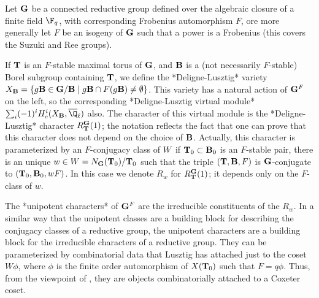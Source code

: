 \def\bB{{\bf B}}
\def\bG{{\bf G}}
\def\bL{{\bf L}}
\def\bP{{\bf P}}
\def\bT{{\bf T}}
\def\bU{{\bf U}}
\def\Sym{{\mathfrak S}}

Let $\bG$ be a connected reductive group defined over the algebraic closure
of  a finite field  $\F_q$, with corresponding  Frobenius automorphism $F$,
ore  more generally let $F$ be  an isogeny of $\bG$ such  that a power is a
Frobenius (this covers the Suzuki and Ree groups).

If  $\bT$ is  an $F$-stable  maximal torus  of $\bG$,  and $\bB$  is a (not
necessarily  $F$-stable)  Borel  subgroup  containing  $\bT$, we define the
*Deligne-Lusztig*    variety   $X_\bB=\{   g\bB\in\bG/\bB   \mid   g\bB\cap
F(g\bB)\ne\emptyset\}$. This variety has a natural action of $\bG^F$ on the
left,  so the corresponding *Deligne-Lusztig virtual module* $\sum_i (-1)^i
H^i_c(X_\bB,\overline\Q_\ell)$  also. The character  of this virtual module
is  the *Deligne-Lusztig*  character $R_\bT^\bG(1)$;  the notation reflects
the  fact that  one can  prove that  this character  does not depend on the
choice   of  $\bB$.  Actually,  this   character  is  parameterized  by  an
$F$-conjugacy class of $W$\:\ if $\bT_0\subset\bB_0$ is an $F$-stable pair,
there  is  an  unique  $w\in  W=N_\bG(\bT_0)/\bT_0$  such  that  the triple
$(\bT,\bB,F)$  is $\bG$-conjugate  to $(\bT_0,\bB_0,wF)$.  In this  case we
denote $R_w$ for $R_\bT^\bG(1)$; it depends only on the $F$-class of $w$.

The  *unipotent characters* of $\bG^F$  are the irreducible constituents of
the $R_w$. In a similar way that the unipotent classes are a building block
for  describing the conjugacy  classes of a  reductive group, the unipotent
characters  are  a  building  block  for  the  irreducible  characters of a
reductive  group.  They  can  be  parameterized  by combinatorial data that
Lusztig  has attached just to the coset $W\phi$, where $\phi$ is the finite
order  automorphism  of  $X(\bT_0)$  such  that  $F=q\phi$.  Thus, from the
viewpoint  of  \CHEVIE,  they  are  objects  combinatorially  attached to a
Coxeter coset.

